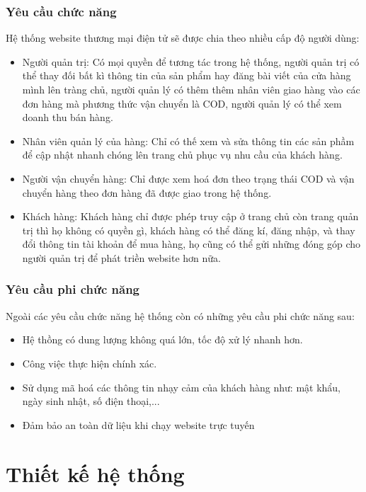 \subsubsection{Yêu cầu chức năng}
 Hệ thống website thương mại điện tử sẽ được chia theo nhiều cấp độ người dùng:
\begin{itemize}
 \item Người quản trị: Có mọi quyền để tương tác trong hệ thống, người quản trị có thể thay đối bất kì thông tin của sản phẩm hay đăng bài viết của cửa hàng mình lên tràng chủ, người quản lý có thêm thêm nhân viên giao hàng vào các đơn hàng mà phương thức vận chuyển là COD, người quản lý có thể xem doanh thu bán hàng.  
 \item Nhân viên quản lý của hàng: Chỉ có thế xem và sửa thông tin các sản phầm để cập nhật nhanh chóng lên trang chủ phục vụ nhu cầu của khách hàng.
 \item Người vận chuyển hàng: Chỉ được xem hoá đơn theo trạng thái COD và vận chuyển hàng theo đơn hàng đã được giao trong hệ thống.
 \item Khách hàng: Khách hàng chỉ được phép truy cập ở trang chủ còn trang quản trị thì họ không có quyền gì, khách hàng có thể đăng kí, đăng nhập, và thay đổi thông tin tài khoản để mua hàng, họ cũng có thể gửi những đóng góp cho người quản trị để phát triền website hơn nữa.
\end{itemize}  
\subsubsection{Yêu cầu phi chức năng}
Ngoài các yêu cầu chức năng hệ thống còn có những yêu cầu phi chức năng sau:
\begin{itemize}
\item Hệ thồng có dung lượng không quá lớn, tốc độ xử lý nhanh hơn.
\item Công việc thực hiện chính xác.
\item Sử dụng mã hoá các thông tin nhạy cảm của khách hàng như: mật khẩu, ngày sinh nhật, số điện thoại,...
\item Đảm bảo an toàn dữ liệu khi chạy website trực tuyến
\end{itemize}
\section{Thiết kế hệ thống}
